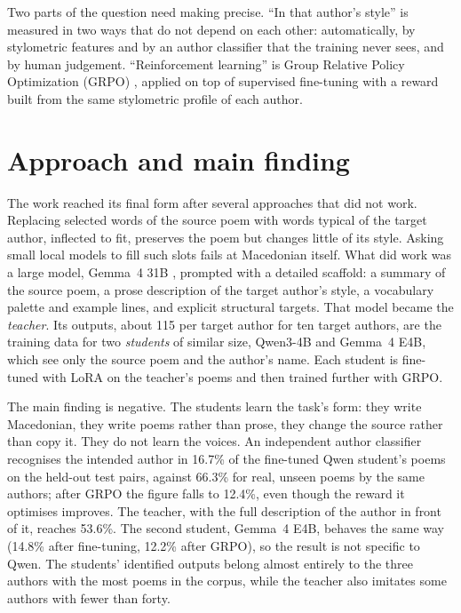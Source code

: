 Two parts of the question need making precise. ``In that author's style''
is measured in two ways that do not depend on each other: automatically,
by stylometric features and by an author classifier that the training never
sees, and by human judgement. ``Reinforcement learning'' is Group Relative
Policy Optimization (GRPO) \citep{shao2024deepseekmath}, applied on top
of supervised fine-tuning with a reward built from the same stylometric
profile of each author.

\section{Approach and main finding}

The work reached its final form after several approaches that did not work.
Replacing selected words of the source poem with words typical of the
target author, inflected to fit, preserves the poem but changes little of
its style. Asking small local models to fill such slots fails at
Macedonian itself. What did work was a large model, Gemma~4 31B
\citep{gemma4}, prompted with a detailed scaffold: a summary of the source
poem, a prose description of the target author's style, a vocabulary
palette and example lines, and explicit structural targets. That model
became the \emph{teacher}. Its outputs, about 115 per target author for ten
target authors, are the training data for two \emph{students} of similar
size, Qwen3-4B \citep{yang2025qwen3} and Gemma~4 E4B, which see only the source
poem and the author's name. Each student is fine-tuned with LoRA
\citep{hu2022lora} on the teacher's poems and then trained
further with GRPO.

The main finding is negative. The students learn the task's form: they
write Macedonian, they write poems rather than prose, they change the
source rather than copy it. They do not learn the voices. An independent
author classifier recognises the intended author in 16.7\% of the
fine-tuned Qwen student's poems on the held-out test pairs, against 66.3\%
for real, unseen poems by the same authors; after GRPO the figure falls to
12.4\%, even though the reward it optimises improves. The teacher, with the
full description of the author in front of it, reaches 53.6\%.
The second student, Gemma~4 E4B, behaves the same way (14.8\% after fine-tuning, 12.2\% after GRPO), so the result is not specific to Qwen.  The students'
identified outputs belong almost entirely to the three authors with the most
poems in the corpus, while the teacher also imitates some authors with fewer
than forty.

